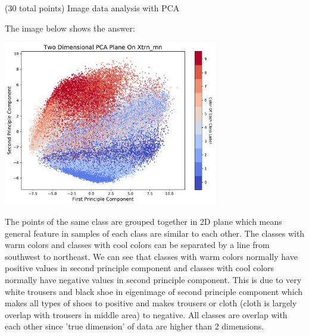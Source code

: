 \documentclass[12pt]{article}
\begin{document}
\begin{question}{(30 total points) Image data analysis with PCA}
\begin{subquestion}
   

      \begin{answerbox}{40em}
         The image below shows the answer:
         \begin{center}
         \includegraphics[width=0.7\textwidth]{PCA4.pdf}
         \end{center}
        The points of the same class are grouped together in 2D plane which means general feature in samples of each class are similar to each other. The classes with warm colors and classes with cool colors can be separated by a line from southwest to northeast. We can see that classes with warm colors normally have positive values in second principle component and classes with cool colors normally have negative values in second principle component. This is due to very white trousers and black shoe in eigenimage of second principle component which makes all types of shoes to positive and makes trousers or cloth (cloth is largely overlap with trousers in middle area) to negative. All classes are overlap with each other since 'true dimension' of data are higher than 2 dimensions.
      \end{answerbox}
  


   \end{subquestion}
   

\end{question}
\clearpage
%
%
\end{document}
